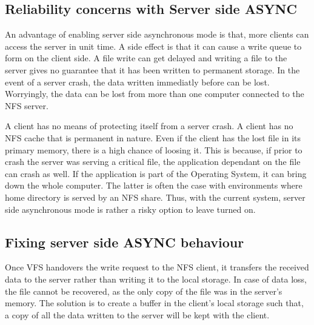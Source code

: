 \documentclass[conference]{IEEEtran}
\begin{document}
\subsection{Reliability concerns with Server side ASYNC}\label{AA}
An advantage of enabling server side asynchronous mode is that, more
clients can access the server in unit time. A side effect is that it can
cause a write queue to form on the client side. A file write can get delayed
and writing a file to the server gives no guarantee that it has been written
to permanent storage. In the event of a server crash, the data written
immediatly before can be lost. Worryingly, the data can be lost from more
than one computer connected to the NFS server.

A client has no means of protecting itself from a server crash. A client has
no NFS cache that is permanent in nature. Even if the client has the lost
file in its primary memory, there is a high chance of loosing it. This is
because, if prior to crash the server was serving a critical file, the
application dependant on the file can crash as well. If the application is
part of the Operating System, it can bring down the whole computer. The
latter is often the case with environments where home directory is served by
an NFS share. Thus, with the current system, server side asynchronous mode
is rather a risky option to leave turned on.

\subsection{Fixing server side ASYNC behaviour}

Once VFS handovers the write request to the NFS client, it transfers the 
received data to the server rather than writing it to the local storage. In
case of data loss, the file cannot be recovered, as the only copy of the
file was in the server's memory. The solution is to create a buffer in the 
client's local storage such that, a copy of all the data written to the
server will be kept with the client.
\end{document}
